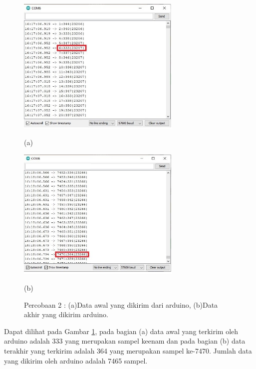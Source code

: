 \begin{figure}[H] \centering
	\includegraphics[width=0.7\textwidth]{img/percob/Slide3}
	
	(a)
	
	\includegraphics[width=0.7\textwidth]{img/percob/Slide4}
	
	(b)
	
	\caption{Percobaan 2 : (a)Data awal yang dikirim dari arduino, (b)Data akhir yang dikirim arduino.}
	\label{fig:4.2.1}
\end{figure}
\vspace{1ex}
Dapat dilihat pada Gambar \ref{fig:4.2.1}, pada bagian (a) data awal yang terkirim oleh arduino adalah 333 yang merupakan sampel keenam dan pada bagian (b) data terakhir yang terkirim adalah 364 yang merupakan sampel ke-7470. Jumlah data yang dikirim oleh arduino adalah 7465 sampel.

